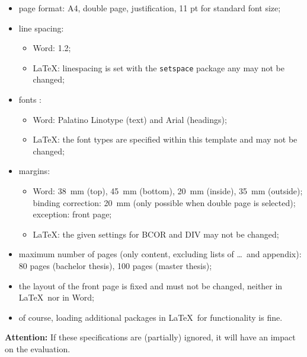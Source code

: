 \begin{mdframed}[backgroundcolor=dbta_blue!100, linecolor=tub_red, linewidth=4pt, roundcorner=10pt, fontcolor=white]
	\begin{itemize}[leftmargin=4mm]
		\item page format: A4, double page, justification, 11 pt for standard font size;
		\item line spacing:
		      \begin{itemize}[label={$\circ$}]
			      \item Word: 1.2;
			      \item \LaTeX: linespacing is set with the \verb+setspace+ package any may not be changed;
		      \end{itemize}
		\item fonts :
		      \begin{itemize}[label={$\circ$}]
			      \item Word: Palatino Linotype (text) and Arial (headings);
			      \item \LaTeX: the font types are specified within this template and may not be changed;
		      \end{itemize}
		\item margins:
		      \begin{itemize}[label={$\circ$}]
			      \item Word: \SI{38}{\milli\metre} (top), \SI{45}{\milli\metre} (bottom), \SI{20}{\milli\metre} (inside), \SI{35}{\milli\metre} (outside);\\
			            binding  correction:  \SI{20}{\milli\metre}  (only  possible  when  double  page  is  selected); exception: front page;
			      \item \LaTeX: the given settings for BCOR and DIV may not be changed;
		      \end{itemize}
		\item maximum number of pages (only content, excluding lists of \dots\ and appendix): 80 pages (bachelor thesis), 100 pages (master thesis);
		\item the layout of the front page is fixed and must not be changed, neither in \LaTeX\ nor in Word;
		\item of course, loading additional packages in \LaTeX\ for functionality is fine.
	\end{itemize}
	\begin{mdframed}[backgroundcolor=white, linecolor=dbta_blue, linewidth=4pt, roundcorner=10pt, fontcolor=black]
		\textbf{Attention:} If these specifications are (partially) ignored, it will have an impact on the evaluation.
	\end{mdframed}
\end{mdframed}
